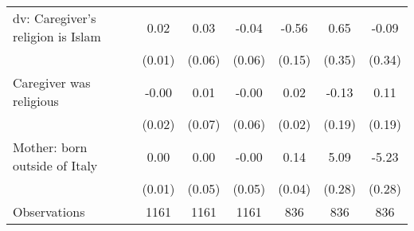 {\begin{tabular}{l*{6}{c}}
\addlinespace
dv: Caregiver's religion is Islam&        0.02         &        0.03         &       -0.04         &       -0.56\sym{***}&        0.65         &       -0.09         \\
                    &      (0.01)         &      (0.06)         &      (0.06)         &      (0.15)         &      (0.35)         &      (0.34)         \\
\addlinespace
Caregiver was religious&       -0.00         &        0.01         &       -0.00         &        0.02         &       -0.13         &        0.11         \\
                    &      (0.02)         &      (0.07)         &      (0.06)         &      (0.02)         &      (0.19)         &      (0.19)         \\
\addlinespace
Mother: born outside of Italy&        0.00         &        0.00         &       -0.00         &        0.14\sym{***}&        5.09\sym{***}&       -5.23\sym{***}\\
                    &      (0.01)         &      (0.05)         &      (0.05)         &      (0.04)         &      (0.28)         &      (0.28)         \\
\midrule
Observations        &        1161         &        1161         &        1161         &         836         &         836         &         836         \\
\bottomrule
\end{tabular}
}
